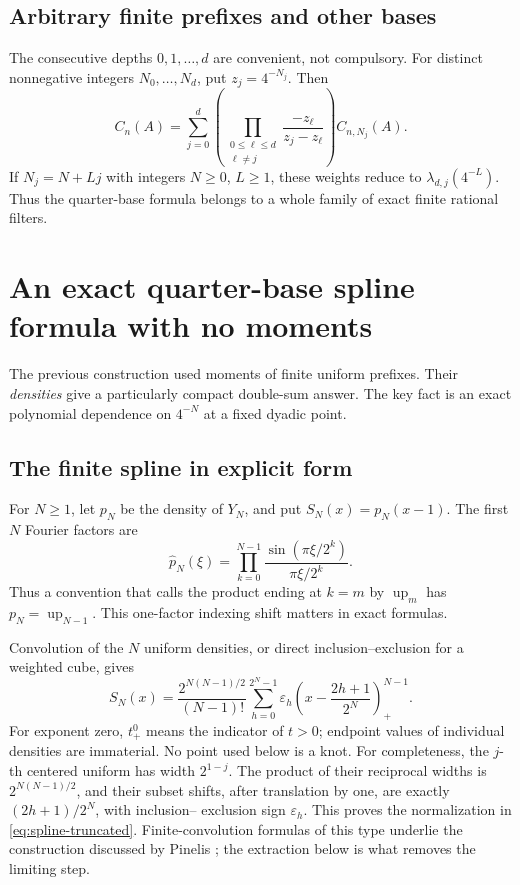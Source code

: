 \documentclass[11pt,a4paper]{article}
\theoremstyle{definition}
\theoremstyle{remark}
\newcommand{\Up}{\operatorname{up}}
\newcommand{\eps}{\varepsilon}
\begin{document}
\subsection{Arbitrary finite prefixes and other bases}
The consecutive depths \(0,1,\ldots,d\) are convenient, not compulsory.
For distinct nonnegative integers \(N_0,\ldots,N_d\), put \(z_j=4^{-N_j}\).
Then
\begin{equation}
 C_n(A)=\sum_{j=0}^{d}
       \left(\prod_{\substack{0\leq\ell\leq d\\\ell\ne j}}
              \frac{-z_\ell}{z_j-z_\ell}\right)C_{n,N_j}(A).
                                                               \label{eq:arbitrary-prefix}
\end{equation}
If \(N_j=N+Lj\) with integers \(N\geq0\), \(L\geq1\), these weights reduce to
\(\lambda_{d,j}(4^{-L})\).  Thus the quarter-base formula belongs to a whole
family of exact finite rational filters.

\section{An exact quarter-base spline formula with no moments}
\label{sec:spline}
The previous construction used moments of finite uniform prefixes.  Their
\emph{densities} give a particularly compact double-sum answer.  The key fact is an
exact polynomial dependence on \(4^{-N}\) at a fixed dyadic point.

\subsection{The finite spline in explicit form}
For \(N\geq1\), let \(p_N\) be the density of \(Y_N\), and put
\(S_N(x)=p_N(x-1)\).  The first \(N\) Fourier factors are
\[
 \widehat p_N(\xi)=\prod_{k=0}^{N-1}
                   \frac{\sin(\pi\xi/2^k)}{\pi\xi/2^k}.
\]
Thus a convention that calls the product ending at \(k=m\) by \(\Up_m\)
has \(p_N=\Up_{N-1}\).  This one-factor indexing shift matters in exact formulas.

Convolution of the \(N\) uniform densities, or direct inclusion--exclusion for a
weighted cube, gives
\begin{equation}
 S_N(x)=\frac{2^{N(N-1)/2}}{(N-1)!}
       \sum_{h=0}^{2^N-1}\eps_h
       \left(x-\frac{2h+1}{2^N}\right)_+^{N-1}.         \label{eq:spline-truncated}
\end{equation}
For exponent zero, \(t_+^0\) means the indicator of \(t>0\); endpoint values of
individual densities are immaterial.  No point used below is a knot.
For completeness, the \(j\)-th centered uniform has width \(2^{1-j}\).
The product of their reciprocal widths is \(2^{N(N-1)/2}\), and their subset
shifts, after translation by one, are exactly \((2h+1)/2^N\), with inclusion--
exclusion sign \(\eps_h\).  This proves the normalization in
\eqref{eq:spline-truncated}.  Finite-convolution formulas of this type underlie the
construction discussed by Pinelis \cite{pinelis2020}; the extraction below is what
removes the limiting step.
\end{document}
